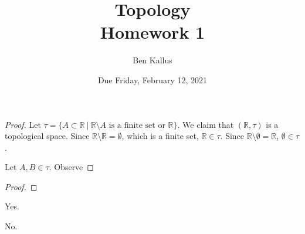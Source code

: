 \documentclass{article}
\date{Due Friday, February 12, 2021}
\author{Ben Kallus}
\title{Topology \\ Homework 1}
\newcommand{\R}{\mathbb R}
\begin{document}
\pagecolor{black}
\color{white}
\maketitle

\begin{proof}
    Let $\tau = \{A \subset \R~|~\R \setminus A \text{ is a finite set or } \R\}$.
    We claim that $(\R, \tau)$ is a topological space.
    Since $\R \setminus \R = \emptyset$, which is a finite set, $\R \in \tau$.
    Since $\R \setminus \emptyset = \R$, $\emptyset \in \tau$.

    Let $A,B \in \tau$.
    Observe 
\end{proof}

\bigskip
{}
\begin{proof}
\end{proof}

\bigskip
{} Yes.

\bigskip
{} 

\bigskip
{}
 No.

\medskip
{} 

\medskip
{}

\medskip
{}

\medskip
{}
\end{document}
